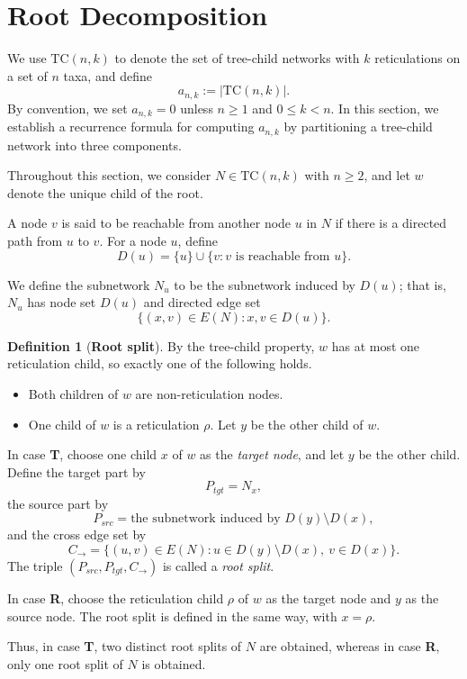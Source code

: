\documentclass[11pt]{article}
\theoremstyle{definition}
\newtheorem{definition}[theorem]{Definition}
\theoremstyle{remark}
\newcommand{\TC}{\text{TC}}
\begin{document}
\section{Root Decomposition}\label{sec:split}


We use $\TC(n,k)$ to denote the set of tree-child networks with $k$ reticulations on a set of $n$ taxa, and define
$$
a_{n,k}:=|\TC(n,k)|.
$$
By convention, we set $a_{n,k}=0$ unless $n\geq 1$ and $0\leq k<n$. In this section, we establish a recurrence formula for computing $a_{n,k}$ by partitioning a tree-child network into three components.

Throughout this section, we consider $N\in\TC(n,k)$ with $n\geq 2$, and let $w$ denote the unique child of the root.

A node $v$ is said to be reachable from another node $u$ in $N$ if there is a directed path from $u$ to $v$. For a node $u$, define
$$
D(u)=\{u\}\cup\{v: v\text{ is reachable from }u\}.
$$

We define the subnetwork $N_u$ to be the subnetwork induced by $D(u)$; that is, $N_u$ has node set $D(u)$ and directed edge set
$$
\{(x,v)\in E(N): x,v\in D(u)\}.
$$


\begin{definition}[{\bf Root split}]
By the tree-child property, $w$ has at most one reticulation child,
so exactly one of the following holds.
\begin{itemize}
\item[\textbf{T}] Both children of $w$ are non-reticulation nodes.
\item[\textbf{R}] One child of $w$ is a reticulation $\rho$.
Let $y$ be the other child of $w$.
\end{itemize}

In case \textbf{T}, choose one child $x$ of $w$ as the \textit{target node},
and let $y$ be the other child. Define the target part by
\[
P_{tgt}=N_x,
\]
the source part by
\[
P_{src}=\text{the subnetwork induced by }D(y)\setminus D(x),
\]
and the cross edge set by
\[
C_{\rightarrow}
=\{(u,v)\in E(N):u\in D(y)\setminus D(x),\ v\in D(x)\}.
\]
The triple $(P_{src},P_{tgt},C_{\rightarrow})$ is called a \textit{root split}.

In case \textbf{R}, choose the reticulation child $\rho$ of $w$ as the
target node and $y$ as the source node. The root split is defined in
the same way, with $x=\rho$.

Thus, in case \textbf{T}, two distinct root splits of $N$ are obtained,
whereas in case \textbf{R}, only one root split of $N$ is obtained.
\end{definition}
\end{document}
